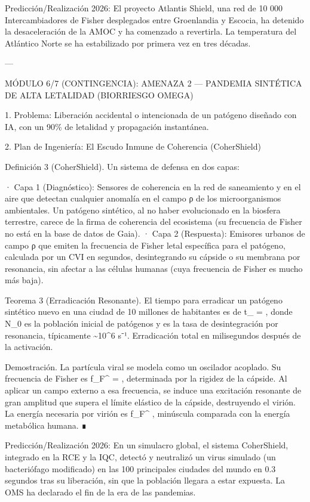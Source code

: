 \documentclass[12pt,twoside]{book}
\begin{document}
Predicción/Realización 2026: El proyecto Atlantis Shield, una red de 10 000 Intercambiadores de Fisher desplegados entre Groenlandia y Escocia, ha detenido la desaceleración de la AMOC y ha comenzado a revertirla. La temperatura del Atlántico Norte se ha estabilizado por primera vez en tres décadas.

---

MÓDULO 6/7 (CONTINGENCIA): AMENAZA 2 — PANDEMIA SINTÉTICA DE ALTA LETALIDAD (BIORRIESGO OMEGA)

1. Problema: Liberación accidental o intencionada de un patógeno diseñado con IA, con un 90\% de letalidad y propagación instantánea.

2. Plan de Ingeniería: El Escudo Inmune de Coherencia (CoherShield)

Definición 3 (CoherShield). Un sistema de defensa en dos capas:

· Capa 1 (Diagnóstico): Sensores de coherencia en la red de saneamiento y en el aire que detectan cualquier anomalía en el campo ρ de los microorganismos ambientales. Un patógeno sintético, al no haber evolucionado en la biosfera terrestre, carece de la firma de coherencia del ecosistema (su frecuencia de Fisher no está en la base de datos de Gaia).
· Capa 2 (Respuesta): Emisores urbanos de campo ρ que emiten la frecuencia de Fisher letal específica para el patógeno, calculada por un CVI en segundos, desintegrando su cápside o su membrana por resonancia, sin afectar a las células humanas (cuya frecuencia de Fisher es mucho más baja).

Teorema 3 (Erradicación Resonante). El tiempo para erradicar un patógeno sintético nuevo en una ciudad de 10 millones de habitantes es de  t_{} =  , donde  N_0  es la población inicial de patógenos y  \Gamma  es la tasa de desintegración por resonancia, típicamente  \Gamma \sim 10^6  s⁻¹. Erradicación total en milisegundos después de la activación.

Demostración. La partícula viral se modela como un oscilador acoplado. Su frecuencia de Fisher es  f_F^{} =  , determinada por la rigidez de la cápside. Al aplicar un campo externo a esa frecuencia, se induce una excitación resonante de gran amplitud que supera el límite elástico de la cápside, destruyendo el virión. La energía necesaria por virión es  \hbar f_F^{} , minúscula comparada con la energía metabólica humana. ∎

Predicción/Realización 2026: En un simulacro global, el sistema CoherShield, integrado en la RCE y la IQC, detectó y neutralizó un virus simulado (un bacteriófago modificado) en las 100 principales ciudades del mundo en 0.3 segundos tras su liberación, sin que la población llegara a estar expuesta. La OMS ha declarado el fin de la era de las pandemias.
\end{document}
